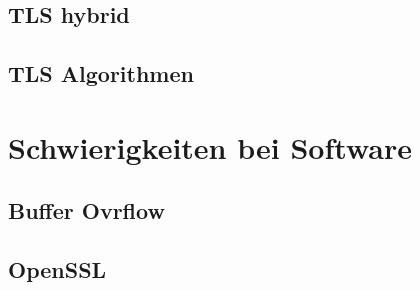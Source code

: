 \documentclass[11pt]{scrartcl}
\begin{document}
\subsection{TLS hybrid}
\label{sec:tls-hybrid}

\subsection{TLS Algorithmen}
\label{sec:tls-algorithmen}


\section{Schwierigkeiten bei Software}
\label{sec:sw-trouble}

\subsection{Buffer Ovrflow}
\label{sec:buffer-overflow}

\subsection{OpenSSL}
\label{sec:openssl}

\newpage
\listoffigures
{}
\mbox{}
\nocite{*}


\end{document}
